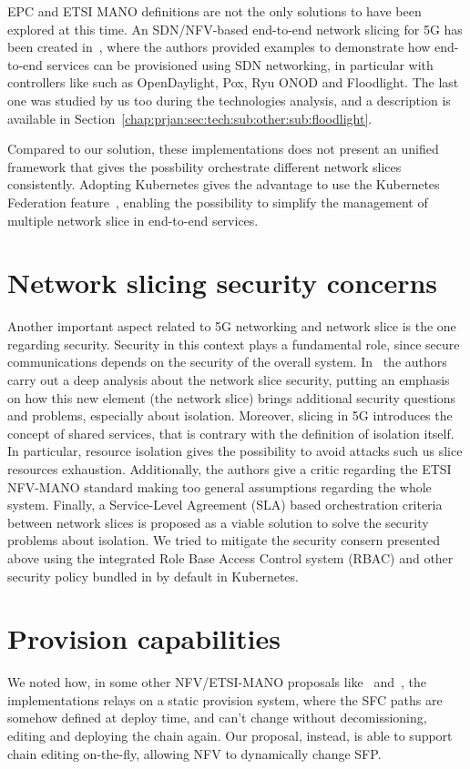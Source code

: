 EPC and ETSI MANO definitions are not the only solutions to have been explored
at this time. An SDN/NFV-based end-to-end network slicing for 5G has been
created in~\cite{chartsias2017sdn}, where the authors provided examples to
demonstrate how end-to-end services can be provisioned using SDN networking, in
particular with controllers like such as OpenDaylight, Pox, Ryu ONOD and
Floodlight. The last one was studied by us too during the technologies analysis,
and a description is available in
Section~\ref{chap:prjan:sec:tech:sub:other:sub:floodlight}.

Compared to our solution, these implementations does not present an unified
framework that gives the possbility orchestrate different network slices
consistently. Adopting Kubernetes gives the advantage to use the Kubernetes
Federation feature~\cite{kubeFederation}, enabling the possibility to simplify
the management of multiple network slice in end-to-end services.

\section{Network slicing security concerns}

Another important aspect related to 5G networking and network slice is the one
regarding security. Security in this context plays a fundamental role, since
secure communications depends on the security of the overall system.
In~\cite{kotulski2017end} the authors carry out a deep analysis about the
network slice security, putting an emphasis on how this new element (the network
slice) brings additional security questions and problems, especially about
isolation. Moreover, slicing in 5G introduces the concept of shared services,
that is contrary with the definition of isolation itself. In particular,
resource isolation gives the possibility to avoid attacks such us slice
resources exhaustion. Additionally, the authors give a critic regarding the ETSI
NFV-MANO standard making too general assumptions regarding the whole system.
Finally, a Service-Level Agreement (SLA) based orchestration criteria between
network slices is proposed as a viable solution to solve the security problems
about isolation. We tried to mitigate the security consern presented above using
the integrated Role Base Access Control system (RBAC) and other security policy
bundled in by default in Kubernetes.

\section{Provision capabilities}
We noted how, in some other NFV/ETSI-MANO proposals like~\cite{soares2015toward}
and~\cite{abujoda2015midas}, the implementations relays on a static provision
system, where the SFC paths are somehow defined at deploy time, and can't change
without decomissioning, editing and deploying the chain again. Our proposal,
instead, is able to support chain editing on-the-fly, allowing NFV to dynamically
change SFP.

